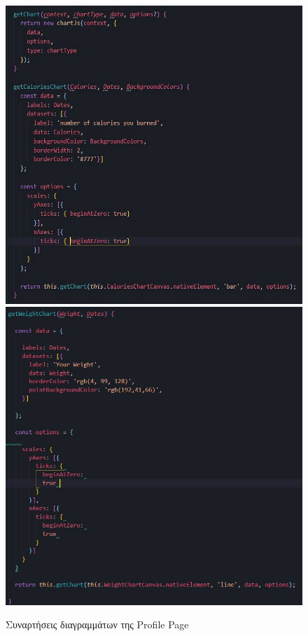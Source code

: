 \documentclass[a4paper,12pt]{article}
\begin{document}
		\begin{figure}[!htb]
			\caption{Συναρτήσεις διαγραμμάτων της Profile Page}
			\vspace*{0.5cm}

			  \includegraphics[width=\linewidth]{calChart}
			\endminipage\hfill
			  \includegraphics[width=\linewidth]{weightChart}
			\endminipage\hfill
		\end{figure}
		\vspace*{1cm}
		
\end{document}
